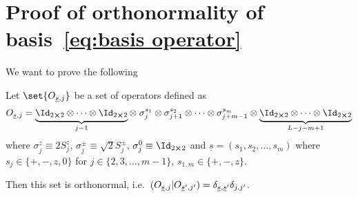 \chapter{Proof of orthonormality of basis~\eqref{eq:basis operator}\label{app:orthonormality}}
\thispagestyle{chapterBeginStyle}


We want to prove the following

\begin{proposition}
    Let \(\set{O_{\underline{s},j}}\) be a set of operators defined as
    \begin{equation}
        O_{\underline{s},j}= \underbrace{\Id_{2\cross 2} \otimes \cdots
        \otimes \Id_{2\cross 2}}_{j-1} \otimes \; \sigma_{j}^{s_{1}} \otimes \sigma_{j+1}^{s_{2}} \otimes
        \cdots \otimes \sigma_{j+m-1}^{s_{m}} \otimes 
        \underbrace{\Id_{2\cross 2} \otimes \cdots \otimes \Id_{2\cross 2}}_{L-j-m+1}
    \end{equation}
    where \(\sigma_j^z \equiv 2 S^z_j\), \(\sigma_j^{\pm} \equiv \sqrt{2} S_j^{\pm}\),
    \(\sigma^{0}_j \equiv \Id_{2\cross 2}\) and \(\underline{s} = \left(s_1, s_2,\ldots,
     s_m\right)\) where \(s_j \in \{+,-,z,0\}\) for \(j \in \{2,3,\ldots,m-1\}\), \(s_{1,m} \in \{+,-,z\}\).
     
    Then this set is orthonormal, i.e.\ \( (O_{\underline{s},j} | O_{\underline{s}^{\prime},j^{\prime}})
    =\delta_{\underline{s},\underline{s}^{\prime}}\delta_{j,j^{\prime}}\).
\end{proposition}

